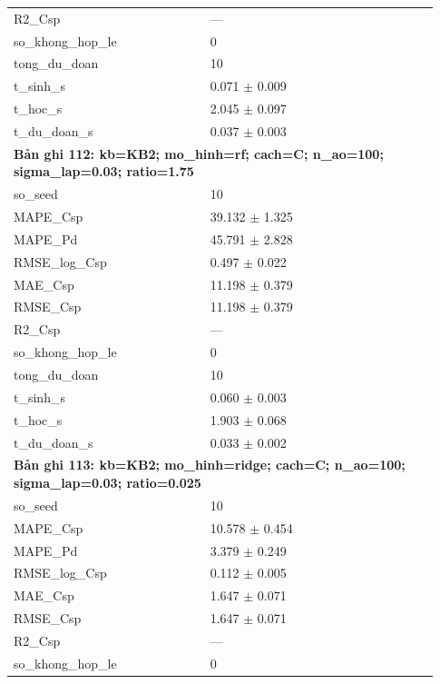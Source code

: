 \begin{longtable}{p{0.43\linewidth}p{0.50\linewidth}}
R2\_\allowbreak Csp & — \\
so\_\allowbreak khong\_\allowbreak hop\_\allowbreak le & 0 \\
tong\_\allowbreak du\_\allowbreak doan & 10 \\
t\_\allowbreak sinh\_\allowbreak s & 0.071 $\pm$ 0.009 \\
t\_\allowbreak hoc\_\allowbreak s & 2.045 $\pm$ 0.097 \\
t\_\allowbreak du\_\allowbreak doan\_\allowbreak s & 0.037 $\pm$ 0.003 \\
\midrule
\multicolumn{2}{p{0.95\linewidth}}{\textbf{Bản ghi 112: kb=KB2; mo\_hinh=rf; cach=C; n\_ao=100; sigma\_lap=0.03; ratio=1.75}} \\
so\_\allowbreak seed & 10 \\
MAPE\_\allowbreak Csp & 39.132 $\pm$ 1.325 \\
MAPE\_\allowbreak Pd & 45.791 $\pm$ 2.828 \\
RMSE\_\allowbreak log\_\allowbreak Csp & 0.497 $\pm$ 0.022 \\
MAE\_\allowbreak Csp & 11.198 $\pm$ 0.379 \\
RMSE\_\allowbreak Csp & 11.198 $\pm$ 0.379 \\
R2\_\allowbreak Csp & — \\
so\_\allowbreak khong\_\allowbreak hop\_\allowbreak le & 0 \\
tong\_\allowbreak du\_\allowbreak doan & 10 \\
t\_\allowbreak sinh\_\allowbreak s & 0.060 $\pm$ 0.003 \\
t\_\allowbreak hoc\_\allowbreak s & 1.903 $\pm$ 0.068 \\
t\_\allowbreak du\_\allowbreak doan\_\allowbreak s & 0.033 $\pm$ 0.002 \\
\midrule
\multicolumn{2}{p{0.95\linewidth}}{\textbf{Bản ghi 113: kb=KB2; mo\_hinh=ridge; cach=C; n\_ao=100; sigma\_lap=0.03; ratio=0.025}} \\
so\_\allowbreak seed & 10 \\
MAPE\_\allowbreak Csp & 10.578 $\pm$ 0.454 \\
MAPE\_\allowbreak Pd & 3.379 $\pm$ 0.249 \\
RMSE\_\allowbreak log\_\allowbreak Csp & 0.112 $\pm$ 0.005 \\
MAE\_\allowbreak Csp & 1.647 $\pm$ 0.071 \\
RMSE\_\allowbreak Csp & 1.647 $\pm$ 0.071 \\
R2\_\allowbreak Csp & — \\
so\_\allowbreak khong\_\allowbreak hop\_\allowbreak le & 0 \\

\end{longtable}
